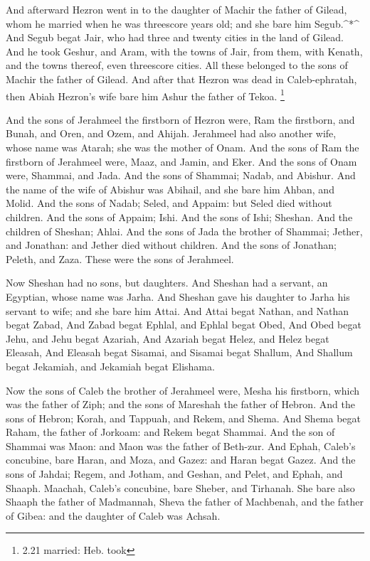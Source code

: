  And afterward Hezron went in to the daughter of Machir the
father of Gilead, whom he married when he was threescore years old; and
she bare him Segub.\^{}*\^{}  And Segub begat Jair, who had
three and twenty cities in the land of Gilead.  And he took
Geshur, and Aram, with the towns of Jair, from them, with Kenath, and
the towns thereof, even threescore cities. All these belonged to the
sons of Machir the father of Gilead.  And after that Hezron
was dead in Caleb-ephratah, then Abiah Hezron's wife bare him Ashur the
father of Tekoa. \footnote{2.21 married: Heb. took}

 And the sons of Jerahmeel the firstborn of Hezron were,
Ram the firstborn, and Bunah, and Oren, and Ozem, and Ahijah.
 Jerahmeel had also another wife, whose name was Atarah;
she was the mother of Onam.  And the sons of Ram the
firstborn of Jerahmeel were, Maaz, and Jamin, and Eker. 
And the sons of Onam were, Shammai, and Jada. And the sons of Shammai;
Nadab, and Abishur.  And the name of the wife of Abishur
was Abihail, and she bare him Ahban, and Molid.  And the
sons of Nadab; Seled, and Appaim: but Seled died without children.
 And the sons of Appaim; Ishi. And the sons of Ishi;
Sheshan. And the children of Sheshan; Ahlai.  And the sons
of Jada the brother of Shammai; Jether, and Jonathan: and Jether died
without children.  And the sons of Jonathan; Peleth, and
Zaza. These were the sons of Jerahmeel.

 Now Sheshan had no sons, but daughters. And Sheshan had a
servant, an Egyptian, whose name was Jarha.  And Sheshan
gave his daughter to Jarha his servant to wife; and she bare him Attai.
 And Attai begat Nathan, and Nathan begat Zabad,
 And Zabad begat Ephlal, and Ephlal begat Obed,
 And Obed begat Jehu, and Jehu begat Azariah, 
And Azariah begat Helez, and Helez begat Eleasah,  And
Eleasah begat Sisamai, and Sisamai begat Shallum,  And
Shallum begat Jekamiah, and Jekamiah begat Elishama.

 Now the sons of Caleb the brother of Jerahmeel were, Mesha
his firstborn, which was the father of Ziph; and the sons of Mareshah
the father of Hebron.  And the sons of Hebron; Korah, and
Tappuah, and Rekem, and Shema.  And Shema begat Raham, the
father of Jorkoam: and Rekem begat Shammai.  And the son of
Shammai was Maon: and Maon was the father of Beth-zur.  And
Ephah, Caleb's concubine, bare Haran, and Moza, and Gazez: and Haran
begat Gazez.  And the sons of Jahdai; Regem, and Jotham,
and Geshan, and Pelet, and Ephah, and Shaaph.  Maachah,
Caleb's concubine, bare Sheber, and Tirhanah.  She bare
also Shaaph the father of Madmannah, Sheva the father of Machbenah, and
the father of Gibea: and the daughter of Caleb was Achsah.

